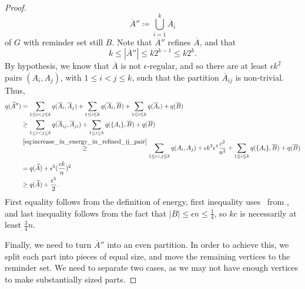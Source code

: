 \begin{lemma}
\begin{proof}
                \[
                    \overline{A}'' \coloneqq \bigcup_{i=1}^k \overline{A}_i
                \]
                of $G$ with reminder set still $B$.
                Note that $\overline{A}''$ refines $\overline{A}$, and that
                \begin{equation} \label{eq:size_of_refined_partition}
                    k \leq |\overline{A}''| \leq k 2^{k-1} \leq k 2^{k}.
                \end{equation}
                By hypothesis, we know that $\overline{A}$ is not $\epsilon$-regular, and so there are at least
                $\epsilon k^2$ pairs $(A_i, A_j)$, with $1 \leq i < j \leq k$, such that the partition $\overline{A}_{ij}$ is
                non-trivial.
                Thus,
                \begin{align*}
                    q(\widetilde{A}'')
                        & = \sum_{1 \leq i < j \leq k} q(\overline{A}_i, \overline{A}_j) + \sum_{1 \leq i \leq k} q(\overline{A}_i, \overline{B})
                            + \sum_{1 \leq i \leq k} q(\overline{A}_i) + q(\overline{B}) \\
                        & \geq \sum_{1 \leq i < j \leq k} q(\overline{A}_{ij}, \overline{A}_{ji})
                            + \sum_{1 \leq i \leq k} q(\{ A_i \}, \overline{B}) + q(\overline{B}) \\
                        & \stackrel{\eqref{eq:increase_in_energy_in_refined_ij_pair}}{\geq}
                            \sum_{1 \leq i < j \leq k} q(A_i, A_j) + \epsilon k^2 \epsilon^4 \frac{c^2}{n^2}
                            + \sum_{1 \leq i \leq k} q(\{ A_i \}, \overline{B}) + q(\overline{B}) \\
                        & = q(\widetilde{A}) + \epsilon^5 ( \frac{c k}{n} )^2 \\
                        & \geq q(\widetilde{A}) + \frac{\epsilon^5}{2}.
                \end{align*}
                First equality follows from the definition of energy, first inequality uses
                ~from ,
                and last inequality follows from the fact that
                $|B| \leq \epsilon n \leq \frac{1}{4}$, so $kc$ is necessarily at least $\frac{3}{4}n$.

                Finally, we need to turn $\overline{A}''$ into an even partition.
                In order to achieve this, we split each part into pieces of equal size, and move the
                remaining vertices to the reminder set.
                We need to separate two cases, as we may not have enough vertices to make substantially sized parts.


\end{proof}
\end{lemma}
